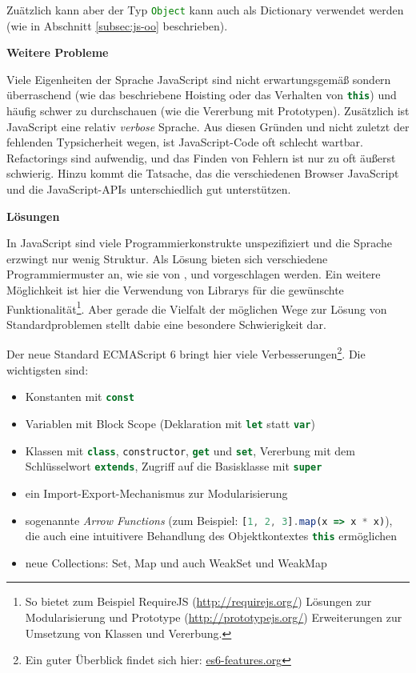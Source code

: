 \documentclass[a4paper, 12pt, hidelinks, listof=totoc, listoftables=totoc, bibliography=totoc]{scrreprt}
\newcommand{\js}[1]{\lstinline[language=JavaScript, style=inline]|#1|}
\newcommand{\MyMiniSec}[1]{\rmfamily\fontsize{12}{15}\selectfont
	\vspace{7pt}\textbf{#1} %
}
\begin{document}
Zuätzlich kann aber der Typ \js{Object} kann auch als Dictionary verwendet werden (wie in Abschnitt \ref{subsec:js-oo} beschrieben).


\MyMiniSec{Weitere Probleme}

Viele Eigenheiten der Sprache JavaScript sind nicht erwartungsgemäß sondern überraschend (wie das beschriebene Hoisting oder das Verhalten von \js{this}) und häufig schwer zu durchschauen (wie die Vererbung mit Prototypen). Zusätzlich ist JavaScript eine relativ \emph{verbose} Sprache. Aus diesen Gründen und nicht zuletzt der fehlenden Typsicherheit wegen, ist JavaScript-Code oft schlecht wartbar. Refactorings sind aufwendig, und das Finden von Fehlern ist nur zu oft äußerst schwierig. Hinzu kommt die Tatsache, das die verschiedenen Browser JavaScript und die JavaScript-\ac{API}s unterschiedlich gut unterstützen.


\MyMiniSec{Lösungen}

In JavaScript sind viele Programmierkonstrukte unspezifiziert und die Sprache erzwingt nur wenig Struktur. Als Lösung bieten sich verschiedene Programmiermuster an, wie sie von \cite{crockford2008.JSG}, \cite{stefanov2010.JSP} und \cite{flanagan2011.JDG} vorgeschlagen werden. Ein weitere Möglichkeit ist hier die Verwendung von Librarys für die gewünschte Funktionalität\footnote{So bietet zum Beispiel RequireJS (\url{http://requirejs.org/}) Lösungen zur Modularisierung und  Prototype (\url{http://prototypejs.org/}) Erweiterungen zur Umsetzung von Klassen und Vererbung.}. Aber gerade die Vielfalt der möglichen Wege zur Lösung von Standardproblemen stellt dabie eine besondere Schwierigkeit dar.

Der neue Standard ECMAScript 6 bringt hier viele Verbesserungen\footnote{Ein guter Überblick findet sich hier: \url{es6-features.org}}. Die wichtigsten sind:

\begin{itemize}
\item Konstanten mit \js{const}
\item Variablen mit Block Scope (Deklaration mit \js{let} statt \js{var})
\item Klassen mit \js{class}, \js{constructor}, \js{get} und \js{set}, Vererbung mit dem Schlüsselwort \js{extends}, Zugriff auf die Basisklasse mit \js{super}
\item ein Import-Export-Mechanismus zur Modularisierung
\item sogenannte \emph{Arrow Functions} (zum Beispiel: \js{[1, 2, 3].map(x => x * x)}), die auch eine intuitivere Behandlung des Objektkontextes \js{this} ermöglichen
\item neue Collections: Set, Map und auch WeakSet und WeakMap
\end{itemize}
\end{document}
